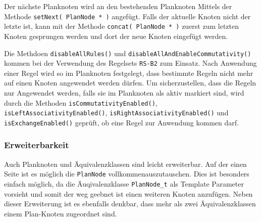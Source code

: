 Der nächste Planknoten wird an den bestehenden Planknoten Mittels der Methode \texttt{setNext( PlanNode * )} angefügt. Falls der aktuelle Knoten nicht der letzte ist, kann mit der Methode \texttt{concat( PlanNode * )} zuerst zum letzten Knoten gesprungen werden und dort der neue Knoten eingefügt werden. 

Die Methdoen \texttt{disableAllRules()} und \texttt{disableAllAndEnableCommutativity()} kommen bei der Verwendung des Regelsets \texttt{RS-B2} zum Einsatz. Nach Anwendung einer Regel wird so im Planknoten festgelegt, dass bestimmte Regeln nicht mehr auf einen Knoten angewendet werden dürfen. Um sicherzustellen, dass die Regeln nur Angewendet werden, falls sie im Planknoten als aktiv markiert sind, wird durch die Methoden \texttt{isCommutativity\-Enabled()}, \texttt{isLeftAssociativity\-Enabled()}, \texttt{is\-Right\-Associativity\-Enabled()} und \texttt{isExchangeEnabled()} geprüft, ob eine Regel zur Anwendung kommen darf.



\subsubsection{Erweiterbarkeit}

Auch Planknoten und Äquivalenzklassen sind leicht erweiterbar. Auf der einen Seite ist es möglich die \texttt{Plan\-Node} vollkommenauszutauschen. Dies ist besonders einfach möglich, da die Äuqivalenzklasse \texttt{PlanNode\_t} als Template Parameter vorsieht und somit der weg geebnet ist einen weiteren Knoten anzufügen. Neben dieser Erweiterung ist es ebenfalls denkbar, dass mehr als zwei Äquivalenzklassen einem Plan-Knoten zugeordnet sind. 